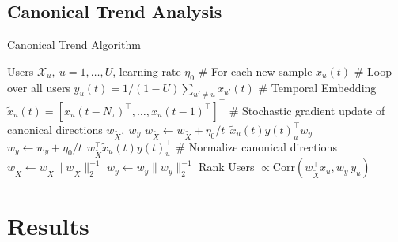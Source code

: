 \documentclass[abstracton, paper=a4, fontsize=11pt]{scrartcl} %
\numberwithin{equation}{section} %
\numberwithin{figure}{section} %
\numberwithin{table}{section} %
\newcommand{\1}{\ensuremath{\mathds{1}}}
\begin{document}
\subsection{Canonical Trend Analysis}



\begin{algorithm}[t]
   \caption{Canonical Trend Algorithm}
   \label{alg:trenddetection}
\begin{algorithmic}
    Users $\mathcal{X}_u,~u=1,\dots,U$, learning rate $\eta_0$
	\STATE \# For each new sample $x_u(t)$
	\STATE \# Loop over all users
   \STATE $y_u(t)=1/(1-U)\sum_{u'\neq u}x_{u'}(t)$
   \STATE \# Temporal Embedding 
   \STATE $\tilde{x}_u(t)=[x_u(t-N_{\tau})^{\top},\dots,x_u(t-1)^{\top}]^{\top}$
   \STATE \# Stochastic gradient update of canonical directions $w_{\tilde{X}},~w_y$ 
   \STATE $w_{\tilde{X}} \leftarrow w_{\tilde{X}} + \eta_0/t~~ \tilde{x}_u(t)y(t)_u^{\top}w_y$
   \STATE $w_{y} \leftarrow w_{y} + \eta_0/t~~ w_{\tilde{X}}^{\top}\tilde{x}_u(t)y(t)_u^{\top}$
	\STATE \# Normalize canonical directions
   \STATE $w_{\tilde{X}} \leftarrow w_{\tilde{X}}\|w_{\tilde{X}}\|_2^{-1}$
   \STATE $w_{y} \leftarrow w_{y}\|w_y\|_2^{-1}$
   \ENDFOR
   \STATE Rank Users $\propto \textrm{Corr}(w_{\tilde{X}}^{\top}x_u, w_y^{\top}y_u)$
   \ENDFOR
\end{algorithmic}
\end{algorithm}



\section{Results}


\pagebreak


\end{document}

